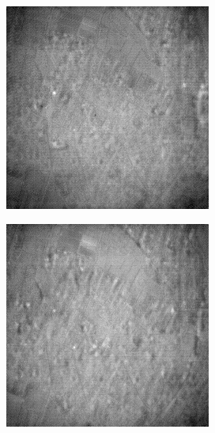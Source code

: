 \documentclass[10pt,twocolumn,letterpaper]{article}
\begin{document}
\begin{figure}[!ht]
\begin{subfigure}[b]{0.19\textwidth}
  \end{subfigure}
  \hfill
  \begin{subfigure}[b]{0.19\textwidth}
      \centering
      \includegraphics[width=\textwidth]{../figs/outputs/cut/2.png}
  \end{subfigure}
  \hfill
  \begin{subfigure}[b]{0.19\textwidth}
      \centering
      \includegraphics[width=\textwidth]{../figs/outputs/petit/2.png}

\end{subfigure}
\end{figure}
\end{document}
